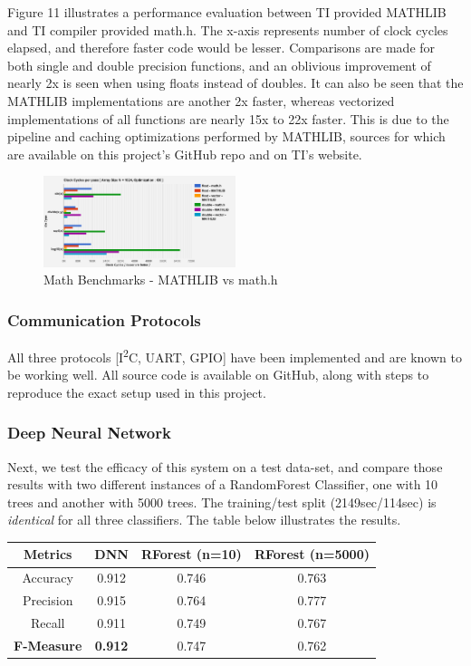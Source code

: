 Figure 11 illustrates a performance evaluation between TI provided MATHLIB and TI compiler provided math.h. The x-axis represents number of clock cycles elapsed, and therefore faster code would be lesser. Comparisons are made for both single and double precision functions, and an oblivious improvement of nearly 2x is seen when using floats instead of doubles. It can also be seen that the MATHLIB implementations are another 2x faster, whereas vectorized implementations of all functions are nearly 15x to 22x faster. This is due to the pipeline and caching optimizations performed by MATHLIB, sources for which are available on this project's GitHub repo and on TI's website. 
\begin{figure}[h!]
  \caption{Math Benchmarks - MATHLIB vs math.h}
  \includegraphics[width=0.5\textwidth]{images/math.png}
\end{figure}




\subsubsection{Communication Protocols}
All three protocols [I\textsuperscript{2}C, UART, GPIO] have been implemented and are known to be working well. All source code is available on GitHub, along with steps to reproduce the exact setup used in this project.\\

\subsubsection{Deep Neural Network}
Next, we test the efficacy of this system on a test data-set, and compare those results with two different instances of a RandomForest Classifier, one with 10 trees and another with 5000 trees. The training/test split (2149sec/114sec) is \emph{identical} for all three classifiers. The table below illustrates the results. 

\begin{center}
 \begin{tabular}{||c c c c||} 
 \hline
 Metrics & \textbf{DNN} & RForest (n=10) & RForest (n=5000) \\ [0.5ex] 
 \hline\hline
 Accuracy & 0.912 & 0.746 & 0.763 \\ 
 \hline
 Precision & 0.915 & 0.764 & 0.777 \\
 \hline
 Recall & 0.911 & 0.749 & 0.767 \\
 \hline
 \textbf{F-Measure} & \textbf{0.912} & 0.747 & 0.762 \\
 \hline
\end{tabular}
\end{center}

